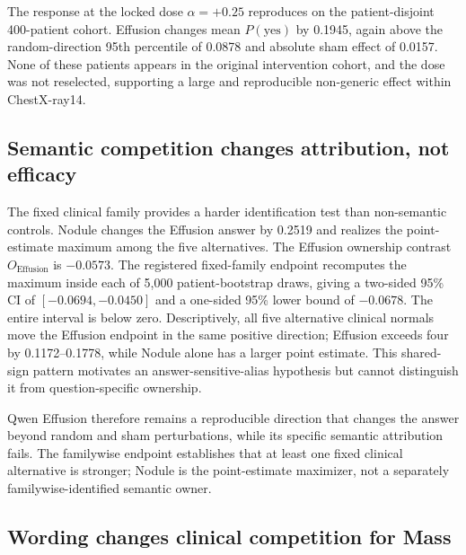 \documentclass{article}
\begin{document}
The response at the locked dose $\alpha=+0.25$ reproduces on the patient-disjoint 400-patient cohort. Effusion changes mean $P(\mathrm{yes})$ by 0.1945, again above the random-direction 95th percentile of 0.0878 and absolute sham effect of 0.0157. None of these patients appears in the original intervention cohort, and the dose was not reselected, supporting a large and reproducible non-generic effect within ChestX-ray14.


\subsection{Semantic competition changes attribution, not efficacy}
\label{sec:specificity-results}

The fixed clinical family provides a harder identification test than non-semantic controls. Nodule changes the Effusion answer by 0.2519 and realizes the point-estimate maximum among the five alternatives. The Effusion ownership contrast $O_{\mathrm{Effusion}}$ is $-0.0573$. The registered fixed-family endpoint recomputes the maximum inside each of 5,000 patient-bootstrap draws, giving a two-sided 95\% CI of $[-0.0694,-0.0450]$ and a one-sided 95\% lower bound of $-0.0678$. The entire interval is below zero. Descriptively, all five alternative clinical normals move the Effusion endpoint in the same positive direction; Effusion exceeds four by 0.1172--0.1778, while Nodule alone has a larger point estimate. This shared-sign pattern motivates an answer-sensitive-alias hypothesis but cannot distinguish it from question-specific ownership.

Qwen Effusion therefore remains a reproducible direction that changes the answer beyond random and sham perturbations, while its specific semantic attribution fails. The familywise endpoint establishes that at least one fixed clinical alternative is stronger; Nodule is the point-estimate maximizer, not a separately familywise-identified semantic owner.

\subsection{Wording changes clinical competition for Mass}
\label{sec:encoding-results}
\end{document}
